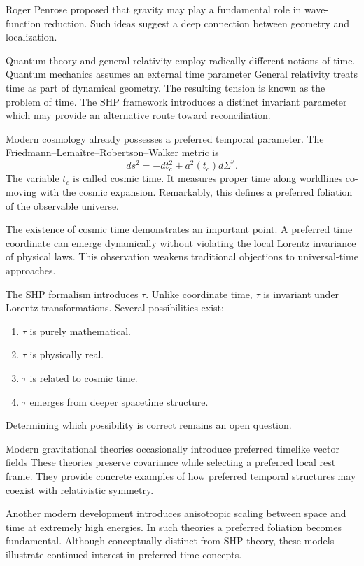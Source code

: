 Roger Penrose proposed that gravity may
play a fundamental role in wave-function reduction.
Such ideas suggest a deep connection between geometry and localization.

Quantum theory and general relativity employ radically different notions
of time.
Quantum mechanics assumes an external time parameter
General relativity treats time as part of dynamical geometry.
The resulting tension is known as the problem of time.
The SHP framework introduces a distinct invariant parameter
which may provide an alternative route toward reconciliation.

Modern cosmology already possesses a preferred temporal parameter.
The Friedmann--Lemaître--Robertson--Walker metric is
\[
ds^2= -dt_c^2+a^2(t_c) d\Sigma^2.
\]
The variable $t_c$  is called cosmic time.
It measures proper time along worldlines co-moving with the cosmic
expansion.
Remarkably, this defines a preferred foliation of the observable
universe.

The existence of cosmic time demonstrates an important point.
A preferred time coordinate can emerge dynamically without violating the
local Lorentz invariance of physical laws.
This observation weakens traditional objections to universal-time
approaches.

The SHP formalism introduces $\tau.$ Unlike coordinate time,
\(\tau\) is invariant under Lorentz transformations.
Several possibilities exist:
\begin{enumerate}
\item \(\tau\) is purely mathematical.
\item \(\tau\) is physically real.
\item \(\tau\) is related to cosmic time.
\item \(\tau\) emerges from deeper spacetime structure.
\end{enumerate}
Determining which possibility is correct remains an open question.

Modern gravitational theories occasionally introduce preferred timelike
vector fields
These theories preserve covariance while selecting a preferred local
rest frame.
They provide concrete examples of how preferred temporal structures may
coexist with relativistic symmetry.

Another modern development introduces anisotropic scaling between space
and time at extremely high energies.
In such theories a preferred foliation becomes fundamental.
Although conceptually distinct from SHP theory, these models illustrate
continued interest in preferred-time concepts.

